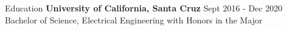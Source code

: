\documentclass{resume} %
\begin{document}
\begin{rSection}{Education}
{\bf University of California, Santa Cruz} \hfill {Sept 2016 - Dec 2020} 
\\ Bachelor of Science, Electrical Engineering with Honors in the Major\hfill 

\end{rSection}




\end{document}
